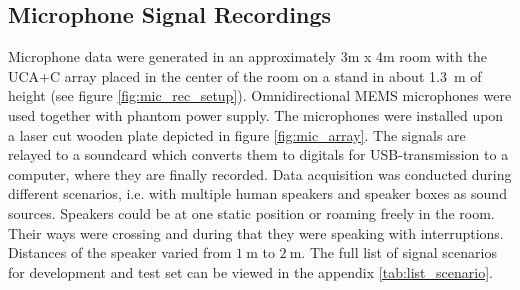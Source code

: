 \subsection{Microphone Signal Recordings}
\label{subsec:mic_rec_setup}
Microphone data were generated in an approximately 3m x 4m room with the \ac{UCA+C} array placed in the center of the room on a stand in about \SI{1.3}{\metre} of height (see figure \ref{fig:mic_rec_setup}). Omnidirectional \ac{MEMS} microphones were used together with phantom power supply. The microphones were installed upon a laser cut wooden plate depicted in figure \ref{fig:mic_array}. The signals are relayed to a soundcard which converts them to digitals for USB-transmission to a computer, where they are finally recorded. Data acquisition was conducted during different scenarios, i.e. with multiple human speakers and speaker boxes as sound sources. Speakers could be at one static position or roaming freely in the room. Their ways were crossing and during that they were speaking with interruptions. Distances of the speaker varied from $\SI{1}{\m}$ to $\SI{2}{\m}$. The full list of signal scenarios for development and test set can be viewed in the appendix \ref{tab:list_scenario}.

